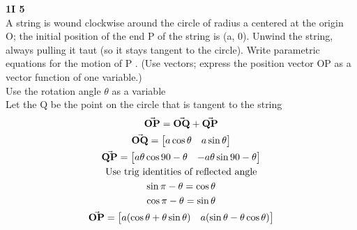 \documentclass[11pt]{article}
\begin{document}
    \begin{problem}
        \textbf{1I 5}\\
        A string is wound clockwise around the circle of radius a centered at the origin O; the initial position of the end P of the string is (a, 0). Unwind the string, always pulling it taut (so it stays tangent to the circle). Write parametric equations for the motion of P .
        (Use vectors; express the position vector OP as a vector function of one variable.)\\
        Use the rotation angle $\theta$ as a variable\\
        Let the Q be the point on the circle that is tangent to the string
        \begin{gather*}
            \va{OP} = \va{OQ} + \va{QP} \\
            \va{OQ} = \bmqty{a\cos{\theta} & a\sin{\theta}} \\
            \va{QP} = \bmqty{a\theta \cos{90 - \theta} & -a\theta \sin{90 - \theta}}\\
            \text{Use trig identities of reflected angle}\\
            \sin{\pi - \theta} = \cos{\theta}\\
            \cos{\pi - \theta} = \sin{\theta}\\
            \va{OP} = \bmqty{a(\cos{\theta} + \theta\sin{\theta}) & a(\sin{\theta} - \theta\cos{\theta})}
        \end{gather*}

    \end{problem}
\end{document}
